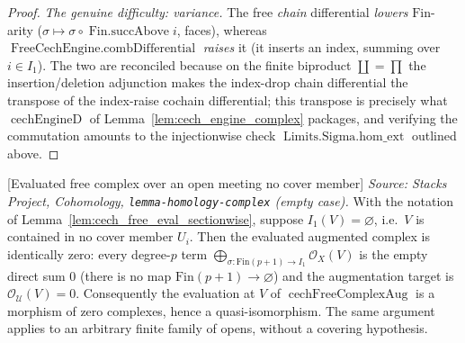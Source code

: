 \begin{proof}
  \emph{The genuine difficulty: variance.} The free \emph{chain} differential
  \emph{lowers} \(\mathrm{Fin}\)-arity (\(\sigma \mapsto \sigma \circ
  \operatorname{Fin.succAbove} i\), faces), whereas
  \(\operatorname{FreeCechEngine.combDifferential}\) \emph{raises} it (it inserts an
  index, summing over \(i \in I_1\)). The two are reconciled because on the finite
  biproduct \(\coprod = \prod\) the insertion/deletion adjunction makes the index-drop
  chain differential the transpose of the index-raise cochain differential; this
  transpose is precisely what \(\operatorname{cechEngineD}\) of
  Lemma~\ref{lem:cech_engine_complex} packages, and verifying the commutation amounts to
  the injectionwise check \(\operatorname{Limits.Sigma.hom\_ext}\) outlined above.
\end{proof}

\begin{lemma}

[Evaluated free complex over an open meeting no cover member]
  \label{lem:cech_free_eval_empty}
  \textit{Source: Stacks Project, Cohomology, \texttt{lemma-homology-complex}
  (empty case).}
  With the notation of Lemma~\ref{lem:cech_free_eval_sectionwise}, suppose
  \(I_1(V) = \varnothing\), i.e.\ \(V\) is contained in no cover member \(U_i\). Then
  the evaluated augmented complex is identically zero: every degree-\(p\) term
  \(\bigoplus_{\sigma : \mathrm{Fin}(p+1) \to I_1} \mathcal{O}_X(V)\) is the empty
  direct sum \(0\) (there is no map \(\mathrm{Fin}(p+1) \to \varnothing\)) and the
  augmentation target is \(\mathcal{O}_{\mathcal{U}}(V) = 0\). Consequently the
  evaluation at \(V\) of \(\operatorname{cechFreeComplexAug}\) is a morphism of zero
  complexes, hence a quasi-isomorphism. The same argument applies to an arbitrary
  finite family of opens, without a covering hypothesis.
\end{lemma}

